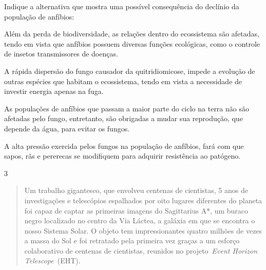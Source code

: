 Indique a alternativa que mostra uma possível consequência do declínio
da população de anfíbios:

\begin{escolha}
\item Além da perda de biodiversidade, as relações dentro do ecossistema
são afetadas, tendo em vista que anfíbios possuem diversas funções
ecológicas, como o controle de insetos transmissores de doenças.

\item A rápida dispersão do fungo causador da quitridiomicose, impede a
evolução de outras espécies que habitam o ecossistema, tendo em vista a
necessidade de investir energia apenas na fuga.

\item As populações de anfíbios que passam a maior parte do ciclo na terra
não são afetadas pelo fungo, entretanto, são obrigadas a mudar sua
reprodução, que depende da água, para evitar os fungos.

\item A alta pressão exercida pelos fungos na população de anfíbios, fará
com que sapos, rãs e pererecas se modifiquem para adquirir resistência
ao patógeno.
\end{escolha}


\num{3}
\begin{quote}
Um trabalho gigantesco, que envolveu centenas de cientistas, 5 anos
de investigações e telescópios espalhados por oito lugares diferentes
do planeta foi capaz de captar as primeiras imagens do Sagittarius A*,
um buraco negro localizado no centro da Via Láctea, a galáxia em que
se encontra o nosso Sistema Solar. O objeto tem impressionantes quatro
milhões de vezes a massa do Sol e foi retratado pela primeira vez
graças a um esforço colaborativo de centenas de cientistas, reunidos
no projeto~\emph{Event Horizon Telescope}~(EHT).

\end{quote}

